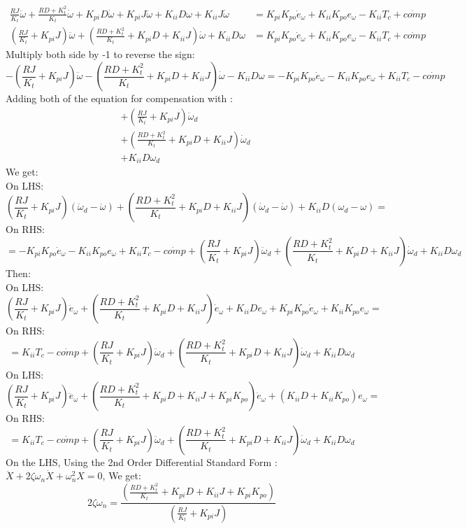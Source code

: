 \documentclass[12pt,a4paper]{article}
\begin{document}
	\[
	\begin{split}
		\frac{RJ}{K_t} \ddot{\omega} + \frac{RD + K_t^2}{K_t} \dot{\omega} + K_{pi}D\dot{\omega} + K_{pi}J \ddot{\omega} + K_{ii}D\omega + K_{ii}J\dot{\omega} &= K_{pi}K_{po}\dot{e}_\omega + K_{ii}K_{po}e_\omega - K_{ii}T_c  + \dot{comp} \\
		(\frac{RJ}{K_t} + K_{pi}J ) \ddot{\omega} + (\frac{RD + K_t^2}{K_t}+ K_{pi}D + K_{ii}J) \dot{\omega} + K_{ii}D\omega &=K_{pi}K_{po}\dot{e}_\omega + K_{ii}K_{po}e_\omega - K_{ii}T_c  + \dot{comp}
	\end{split}
	\]
	Multiply both side by -1 to reverse the sign:
	\[
	-(\frac{RJ}{K_t} + K_{pi}J ) \ddot{\omega} - (\frac{RD + K_t^2}{K_t}+ K_{pi}D + K_{ii}J) \dot{\omega} - K_{ii}D\omega = -K_{pi}K_{po}\dot{e}_\omega - K_{ii}K_{po}e_\omega + K_{ii}T_c  - \dot{comp}
	\]
	Adding both of the equation for compensation with :
	\[
	\begin{split}
	&+(\frac{RJ}{K_t} + K_{pi}J ) \ddot{\omega}_d \\
	&+(\frac{RD + K_t^2}{K_t}+ K_{pi}D + K_{ii}J) \dot{\omega}_d \\
	&+K_{ii}D\omega_d
	\end{split}
	\]
	We get:\\
	On LHS:
	\[
	(\frac{RJ}{K_t} + K_{pi}J ) (\ddot{\omega}_d - \ddot{\omega}) + (\frac{RD + K_t^2}{K_t}+ K_{pi}D + K_{ii}J) (\dot{\omega}_d - \dot{\omega})  + K_{ii}D(\omega_d - \omega) = 
	\]
	On RHS:
	\[
	=-K_{pi}K_{po}\dot{e}_\omega - K_{ii}K_{po}e_\omega + K_{ii}T_c  - \dot{comp} +(\frac{RJ}{K_t} + K_{pi}J ) \ddot{\omega}_d + (\frac{RD + K_t^2}{K_t}+ K_{pi}D + K_{ii}J) \dot{\omega}_d+K_{ii}D\omega_d
	\]
	Then:\\
	On LHS:
	\[
	(\frac{RJ}{K_t} + K_{pi}J ) \ddot{e}_\omega + (\frac{RD + K_t^2}{K_t}+ K_{pi}D + K_{ii}J) \dot{e}_\omega  + K_{ii}D e_\omega +K_{pi}K_{po}\dot{e}_\omega + K_{ii}K_{po}e_\omega= 
	\]
	On RHS:
	\[
	= K_{ii}T_c  - \dot{comp} +(\frac{RJ}{K_t} + K_{pi}J ) \ddot{\omega}_d + (\frac{RD + K_t^2}{K_t}+ K_{pi}D + K_{ii}J) \dot{\omega}_d+K_{ii}D\omega_d
	\]
	On LHS:
	\[
	(\frac{RJ}{K_t} + K_{pi}J ) \ddot{e}_\omega + (\frac{RD + K_t^2}{K_t}+ K_{pi}D + K_{ii}J+K_{pi}K_{po}) \dot{e}_\omega + (K_{ii}D+K_{ii}K_{po}) e_\omega = 
	\]
	On RHS:
	\[
	= K_{ii}T_c  - \dot{comp} +(\frac{RJ}{K_t} + K_{pi}J ) \ddot{\omega}_d + (\frac{RD + K_t^2}{K_t}+ K_{pi}D + K_{ii}J) \dot{\omega}_d+K_{ii}D\omega_d
	\]
	On the LHS, Using the 2nd Order Differential Standard Form : $ \ddot{X} + 2\zeta\omega_n\dot{X} + \omega_n^2 X=0 $, We get:
	\[
	2\zeta\omega_n = \frac{(\frac{RD + K_t^2}{K_t}+ K_{pi}D + K_{ii}J+K_{pi}K_{po})}{(\frac{RJ}{K_t} + K_{pi}J )}
	\]
\end{document}
